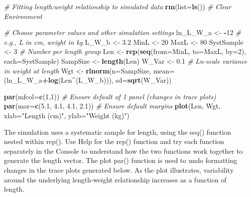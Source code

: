 \documentclass[
]{krantz}
\makeatletter
\newenvironment{Shaded}{\begin{snugshade}}{\end{snugshade}}
\newcommand{\AttributeTok}[1]{\textcolor[rgb]{0.27,0.27,0.27}{#1}}
\newcommand{\CommentTok}[1]{\textcolor[rgb]{0.37,0.37,0.37}{\textit{#1}}}
\newcommand{\DecValTok}[1]{\textcolor[rgb]{0.06,0.06,0.06}{#1}}
\newcommand{\FloatTok}[1]{\textcolor[rgb]{0.06,0.06,0.06}{#1}}
\newcommand{\FunctionTok}[1]{\textcolor[rgb]{0.27,0.27,0.27}{\textbf{#1}}}
\newcommand{\NormalTok}[1]{#1}
\newcommand{\OtherTok}[1]{\textcolor[rgb]{0.37,0.37,0.37}{#1}}
\newcommand{\SpecialCharTok}[1]{\textcolor[rgb]{0.43,0.43,0.43}{\textbf{#1}}}
\newcommand{\StringTok}[1]{\textcolor[rgb]{0.5,0.5,0.5}{#1}}
\newenvironment{kframe}{%
\medskip{}
\setlength{\fboxsep}{.8em}
 \def\at@end@of@kframe{}%
 \ifinner\ifhmode%
  \def\at@end@of@kframe{\end{minipage}}%
  \begin{minipage}{\columnwidth}%
 \fi\fi%
 \def\FrameCommand##1{\hskip\@totalleftmargin \hskip-\fboxsep
 \colorbox{shadecolor}{##1}\hskip-\fboxsep
     \hskip-\linewidth \hskip-\@totalleftmargin \hskip\columnwidth}%
 \MakeFramed {\advance\hsize-\width
   \@totalleftmargin\z@ \linewidth\hsize
   \@setminipage}}%
 {\par\unskip\endMakeFramed%
 \at@end@of@kframe}
\renewenvironment{Shaded}{\begin{kframe}}{\end{kframe}}
\makeatother
\begin{document}
\begin{Shaded}
\begin{Highlighting}[]
\CommentTok{\# Fitting length:weight relationship to simulated data}
\FunctionTok{rm}\NormalTok{(}\AttributeTok{list=}\FunctionTok{ls}\NormalTok{()) }\CommentTok{\# Clear Environment}

\CommentTok{\# Choose parameter values and other simulation settings}
\NormalTok{ln\_L\_W\_a }\OtherTok{\textless{}{-}} \SpecialCharTok{{-}}\DecValTok{12} \CommentTok{\# e.g., L in cm, weight in kg}
\NormalTok{L\_W\_b }\OtherTok{\textless{}{-}} \FloatTok{3.2}
\NormalTok{MinL }\OtherTok{\textless{}{-}} \DecValTok{20}
\NormalTok{MaxL }\OtherTok{\textless{}{-}} \DecValTok{80}
\NormalTok{SystSample }\OtherTok{\textless{}{-}} \DecValTok{3}  \CommentTok{\# Number per length group}
\NormalTok{Len }\OtherTok{\textless{}{-}} \FunctionTok{rep}\NormalTok{(}\FunctionTok{seq}\NormalTok{(}\AttributeTok{from=}\NormalTok{MinL, }\AttributeTok{to=}\NormalTok{MaxL, }\AttributeTok{by=}\DecValTok{2}\NormalTok{), }\AttributeTok{each=}\NormalTok{SystSample)}
\NormalTok{SampSize }\OtherTok{\textless{}{-}} \FunctionTok{length}\NormalTok{(Len)}
\NormalTok{W\_Var }\OtherTok{\textless{}{-}} \FloatTok{0.1} \CommentTok{\# Ln{-}scale variance in weight at length}
\NormalTok{Wgt }\OtherTok{\textless{}{-}} \FunctionTok{rlnorm}\NormalTok{(}\AttributeTok{n=}\NormalTok{SampSize, }\AttributeTok{mean=}\NormalTok{(ln\_L\_W\_a}\SpecialCharTok{+}\FunctionTok{log}\NormalTok{(Len}\SpecialCharTok{\^{}}\NormalTok{(L\_W\_b))),}
              \AttributeTok{sd=}\FunctionTok{sqrt}\NormalTok{(W\_Var))}

\FunctionTok{par}\NormalTok{(}\AttributeTok{mfcol=}\FunctionTok{c}\NormalTok{(}\DecValTok{1}\NormalTok{,}\DecValTok{1}\NormalTok{)) }\CommentTok{\# Ensure default of 1 panel (changes in trace plots)}
\FunctionTok{par}\NormalTok{(}\AttributeTok{mar=}\FunctionTok{c}\NormalTok{(}\FloatTok{5.1}\NormalTok{, }\FloatTok{4.1}\NormalTok{, }\FloatTok{4.1}\NormalTok{, }\FloatTok{2.1}\NormalTok{)) }\CommentTok{\# Ensure default margins}
\FunctionTok{plot}\NormalTok{(Len, Wgt, }\AttributeTok{xlab=}\StringTok{"Length (cm)"}\NormalTok{, }\AttributeTok{ylab=}\StringTok{"Weight (kg)"}\NormalTok{)}
\end{Highlighting}
\end{Shaded}

The simulation uses a systematic sample for length, using the seq() function nested within rep(). Use Help for the rep() function and try each function separately in the Console to understand how the two functions work together to generate the length vector. The plot par() function is used to undo formatting changes in the trace plots generated below. As the plot illustrates, variability around the underlying length-weight relationship increases as a function of length.
\end{document}
